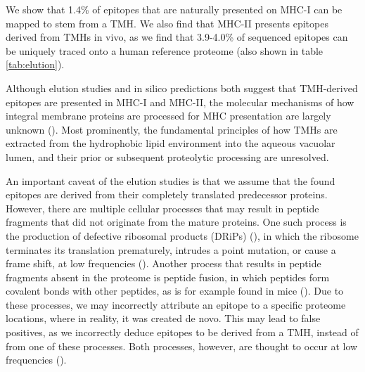 We show that 1.4\% of epitopes that are naturally presented on MHC-I 
can be mapped to stem from a TMH. We also find that MHC-II presents epitopes derived from TMHs in vivo, as we find that 3.9-4.0\% of sequenced epitopes
can be uniquely traced onto a human reference 
proteome (also shown in table \ref{tab:elution}).


Although elution studies and in silico predictions both suggest that TMH-derived epitopes are presented in MHC-I and MHC-II, the molecular mechanisms of how integral membrane proteins are processed for MHC presentation are largely unknown (\cite{bianchi2017}). Most prominently, the fundamental principles of how TMHs are extracted from the  hydrophobic lipid environment into the aqueous vacuolar lumen, and their prior or subsequent proteolytic processing are unresolved.


An important caveat of the elution studies is that we assume that 
the found epitopes are derived from their completely 
translated predecessor proteins.
However, there are multiple cellular processes 
that may result in peptide fragments that did not originate 
from the mature proteins.
One such process is the production of defective ribosomal 
products (DRiPs) (\cite{yewdell1996defective}),
in which the ribosome terminates its translation prematurely,
intrudes a point mutation, 
or cause a frame shift, at low frequencies (\cite{yewdell2011drips}).
Another process that results in peptide fragments absent in the
proteome is peptide fusion, 
in which peptides form covalent bonds with other peptides,
as is for example found in mice (\cite{delong2016pathogenic}).
Due to these processes, we may incorrectly attribute an
epitope to a specific proteome locations, 
where in reality, it was created de novo.
This may lead to false positives, as we incorrectly deduce
epitopes to be derived from a TMH, instead of from one of
these processes. Both processes, however, are thought to
occur at low frequencies (\cite{yewdell2011drips,delong2016pathogenic}).


